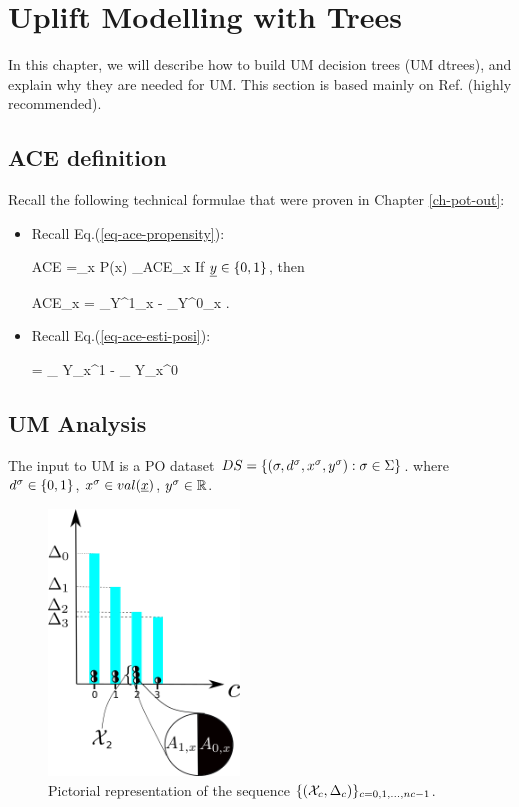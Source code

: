 \documentclass[12pt]{report}
\begin{document}
\chapter{Uplift Modelling with Trees}
\label{ch-uplift-tree}


In this chapter,
we will describe
how to build UM decision trees (UM dtrees),
and explain why they are needed
for UM. This section is based
mainly on Ref.\cite{jaros} (highly recommended).

\section{ACE definition}
Recall
the following technical formulae
that were proven in
Chapter \ref{ch-pot-out}:

\begin{itemize}

\item
Recall Eq.(\ref{eq-ace-propensity}):

\beq
ACE =\sum_x P(x)
_{ACE_x}
\eeq
If $\rvy\in \bool$, then

\beq
ACE_x
=
_{\displaystyle Y^1_x}
-
_{\displaystyle Y^0_x}
\;.
\eeq

\item
Recall
Eq.(\ref{eq-ace-esti-posi}):

\beq
{}
=
_
{\displaystyle Y_x^1}
-
_
{\displaystyle Y_x^0}
\label{eq-est-ace-uplift}
\eeq
\end{itemize}

\section{UM Analysis}
\label{sec-up-analysis}

The input
to UM is a PO
dataset $DS= \{ (\sigma, d^\sigma, x^\sigma, y^\sigma):
 \sigma\in\Sigma\}$.
where $d^\sigma\in \{0,1\}$, $x^\s \in val(\rvx)$,
$y^\sigma\in { \mathbb{R}}$.

\begin{figure}[h!]
\centering
\includegraphics[width=2in]
{../uplift/uplift-bins.png}
\caption{
Pictorial
representation
of the sequence
$\{({\cal X}_c, \Delta_c)\}_{c=0, 1, \ldots, nc-1}$.
}
\label{fig-uplift-bins}
\end{figure}
\end{document}
